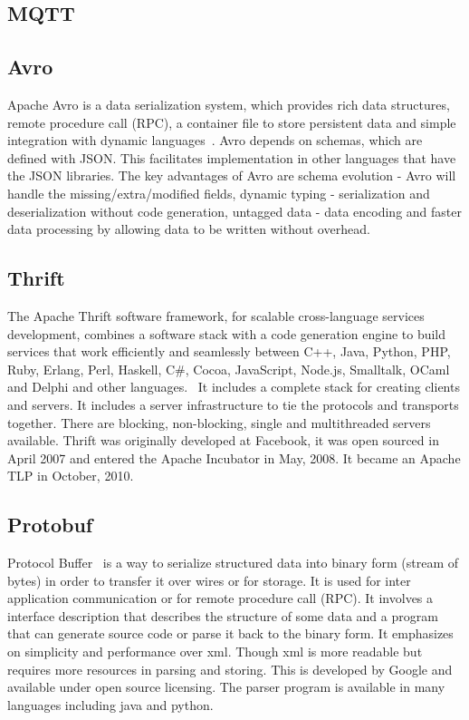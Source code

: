 {\subsection{MQTT}

\subsection{Avro}

Apache Avro is a data serialization system, which provides rich data
structures, remote procedure call (RPC), a container file to store
persistent data and simple integration with dynamic
languages~\cite{www-Avro}.  Avro depends on schemas, which are defined
with JSON. This facilitates implementation in other languages that
have the JSON libraries.  The key advantages of Avro are schema
evolution - Avro will handle the missing/extra/modified fields,
dynamic typing - serialization and deserialization without code
generation, untagged data - data encoding and faster data processing
by allowing data to be written without overhead.
     
\subsection{Thrift \cv}

The Apache Thrift software framework, for scalable cross-language
services development, combines a software stack with a code generation
engine to build services that work efficiently and seamlessly between
C++, Java, Python, PHP, Ruby, Erlang, Perl, Haskell, C\#, Cocoa,
JavaScript, Node.js, Smalltalk, OCaml and Delphi and other
languages.~\cite{paper-thrift} It includes a complete stack for
creating clients and servers. It includes a server infrastructure to
tie the protocols and transports together. There are blocking,
non-blocking, single and multithreaded servers available.  Thrift was
originally developed at Facebook, it was open sourced in April 2007
and entered the Apache Incubator in May, 2008. It became an Apache TLP
in October, 2010.~\cite{www-thrift}
     
\subsection{Protobuf \cv}

Protocol Buffer~\cite{www-protobuf} is a way to serialize structured
data into binary form (stream of bytes) in order to transfer it over
wires or for storage. It is used for inter application communication
or for remote procedure call (RPC). It involves a interface
description that describes the structure of some data and a program
that can generate source code or parse it back to the binary form. It
emphasizes on simplicity and performance over xml. Though xml is more
readable but requires more resources in parsing and storing.  This is
developed by Google and available under open source licensing. The
parser program is available in many languages including java and
python.

}
